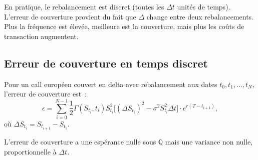 \begin{intuition}[title=\textbf{Couverture en temps discret}]
En pratique, le rebalancement est discret (toutes les $\Delta t$ unit\'es
de temps). L'erreur de couverture provient du fait que $\Delta$ change
entre deux rebalancements. Plus la fr\'equence est \'elev\'ee, meilleure
est la couverture, mais plus les co\^uts de transaction augmentent.
\end{intuition}

\subsection{Erreur de couverture en temps discret}

\begin{proposition}
Pour un call europ\'een couvert en delta avec rebalancement aux dates
$t_0, t_1, \ldots, t_N$, l'erreur de couverture est~:
\[
    \epsilon = \sum_{i=0}^{N-1} \frac{1}{2}\Gamma(S_{t_i}, t_i)
    S_{t_i}^2\bigl[(\Delta S_{t_i})^2 - \sigma^2 S_{t_i}^2 \Delta t\bigr]
    \cdot e^{r(T-t_{i+1})},
\]
o\`u $\Delta S_{t_i} = S_{t_{i+1}} - S_{t_i}$.
\end{proposition}

L'erreur de couverture a une esp\'erance nulle sous $\mathbb{Q}$ mais
une variance non nulle, proportionnelle \`a $\Delta t$.

